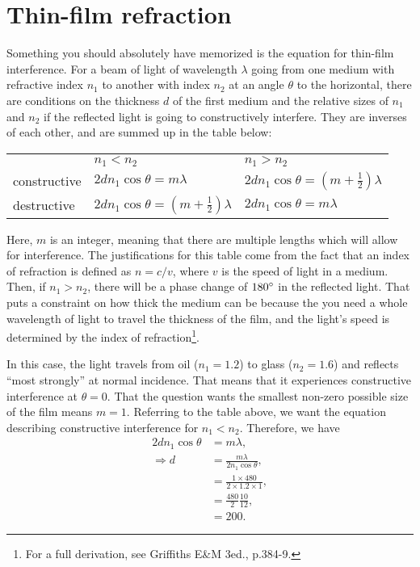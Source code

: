\documentclass[11pt]{paper}
\begin{document}
\section{Thin-film refraction}
Something you should absolutely have memorized is the equation for thin-film interference.  For a beam of light of wavelength $\lambda$ going from one medium with refractive index $n_1$ to another with index $n_2$ at an angle $\theta$ to the horizontal, there are conditions on the thickness $d$ of the first medium and the relative sizes of $n_1$ and $n_2$ if the reflected light is going to constructively interfere.  They are inverses of each other, and are summed up in the table below:
\begin{table}[h]
\centering
\bgroup
\def\arraystretch{1.5}
\begin{tabular}{lll}
                                  & $n_1<n_2$  & $n_1>n_2$     \\ \cline{2-3} 
\multicolumn{1}{l|}{constructive} & \multicolumn{1}{l|}{$2dn_1\cos{\theta} = m\lambda$} & \multicolumn{1}{l|}{$2dn_1\cos{\theta} = \left(m+\frac{1}{2}\right)\lambda$} \\ \cline{2-3} 
\multicolumn{1}{l|}{destructive}  & \multicolumn{1}{l|}{$2dn_1\cos{\theta} = \left(m+\frac{1}{2}\right)\lambda$} & \multicolumn{1}{l|}{$2dn_1\cos{\theta} = m\lambda$} \\ \cline{2-3} 
\end{tabular}
\egroup
\end{table}

Here, $m$ is an integer, meaning that there are multiple lengths which will allow for interference.  The justifications for this table come from the fact that an index of refraction is defined as $n=c/v$, where $v$ is the speed of light in a medium.  Then, if $n_1>n_2$, there will be a phase change of $180\degree$ in the reflected light.  That puts a constraint on how thick the medium can be because the you need a whole wavelength of light to travel the thickness of the film, and the light's speed is determined by the index of refraction\footnote{For a full derivation, see Griffiths E\&M 3ed., p.384-9.}.

In this case, the light travels from oil ($n_1 = 1.2$) to glass ($n_2 = 1.6$) and reflects ``most strongly'' at normal incidence.  That means that it experiences constructive interference at $\theta = 0$.  That the question wants the smallest non-zero possible size of the film means $m=1$.  Referring to the table above, we want the equation describing constructive interference for $n_1<n_2$.  Therefore, we have
\begin{align}
2dn_1\cos{\theta} &= m\lambda,\\
\Rightarrow d &= \frac{m\lambda}{2n_1\cos{\theta}},\\
&=\frac{1\times480}{2\times1.2\times1},\\
&=\frac{480}{2}\frac{10}{12},\\
&=200.
\end{align}
\end{document}
